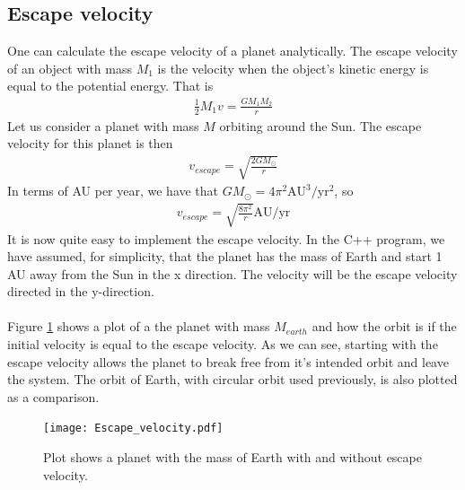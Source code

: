 \documentclass{article}
\begin{document}
\FloatBarrier
\subsection{Escape velocity}
One can calculate the escape velocity of a planet analytically. The escape velocity of an object with mass $M_1$ is the velocity when the object's kinetic energy is equal to the potential energy. That is
\begin{align*}
\frac{1}{2}M_1v = \frac{GM_1M_2}{r}
\end{align*}
Let us consider a planet with mass $M$ orbiting around the Sun. The escape velocity for this planet is then
\begin{align*}
v_{escape} = \sqrt{\frac{2GM_{\odot}}{r}}
\end{align*}
In terms of AU per year, we have that $GM_{\odot} = 4\pi^2 \text{AU}^3/\text{yr}^2$, so
\begin{align*}
v_{escape} = \sqrt{\frac{8\pi^2}{r}} \text{AU}/\text{yr}
\end{align*}
It is now quite easy to implement the escape velocity. In the C++ program, we have assumed, for simplicity, that the planet has the mass of Earth and start 1 AU away from the Sun in the x direction. The velocity will be the escape velocity directed in the y-direction. \\\\
Figure \ref{fig:EscapeVel} shows a plot of a the planet with mass $M_{earth}$ and how the orbit is if the initial velocity is equal to the escape velocity. As we can see, starting with the escape velocity allows the planet to break free from it's intended orbit and leave the system. The orbit of Earth, with circular orbit used previously, is also plotted as a comparison. \\
\begin{figure}[!h]
\centering
\texttt{[image: Escape\_velocity.pdf]}
\caption{Plot shows a planet with the mass of Earth with and without escape velocity.}
\label{fig:EscapeVel}
\end{figure}

\FloatBarrier
\end{document}
